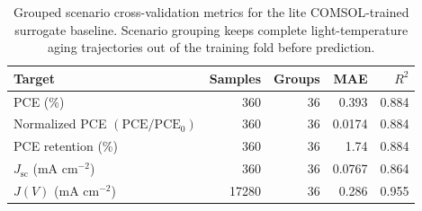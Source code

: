 \begin{table}[H]
\centering
\caption{Grouped scenario cross-validation metrics for the lite COMSOL-trained surrogate baseline. Scenario grouping keeps complete light-temperature aging trajectories out of the training fold before prediction.}
\label{tab:surrogate_lite_cv_metrics}
\small
\begin{tabular}{@{}lrrrr@{}}
\toprule
Target & Samples & Groups & MAE & $R^2$ \\
\midrule
PCE (\%) & 360 & 36 & 0.393 & 0.884 \\
Normalized PCE $(\mathrm{PCE}/\mathrm{PCE}_0)$ & 360 & 36 & 0.0174 & 0.884 \\
PCE retention (\%) & 360 & 36 & 1.74 & 0.884 \\
$J_{\mathrm{sc}}$ (mA cm$^{-2}$) & 360 & 36 & 0.0767 & 0.864 \\
$J(V)$ (mA cm$^{-2}$) & 17280 & 36 & 0.286 & 0.955 \\
\bottomrule
\end{tabular}
\end{table}
